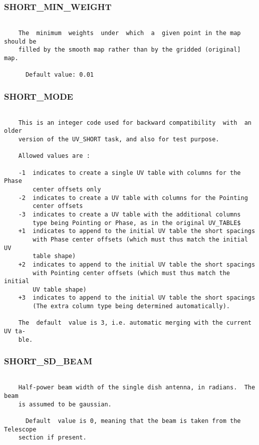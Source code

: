 \subsubsection{SHORT\_MIN\_WEIGHT}
\begin{verbatim}

    The  minimum  weights  under  which  a  given point in the map should be
    filled by the smooth map rather than by the gridded (original] map.

      Default value: 0.01

\end{verbatim}
\subsubsection{SHORT\_MODE}
\begin{verbatim}

    This is an integer code used for backward compatibility  with  an  older
    version of the UV_SHORT task, and also for test purpose.

    Allowed values are :

    -1  indicates to create a single UV table with columns for the Phase
        center offsets only
    -2  indicates to create a UV table with columns for the Pointing
        center offsets
    -3  indicates to create a UV table with the additional columns
        type being Pointing or Phase, as in the original UV_TABLE$
    +1  indicates to append to the initial UV table the short spacings
        with Phase center offsets (which must thus match the initial UV
        table shape)
    +2  indicates to append to the initial UV table the short spacings
        with Pointing center offsets (which must thus match the initial
        UV table shape)
    +3  indicates to append to the initial UV table the short spacings
        (The extra column type being determined automatically).

    The  default  value is 3, i.e. automatic merging with the current UV ta-
    ble.

\end{verbatim}
\subsubsection{SHORT\_SD\_BEAM}
\begin{verbatim}

    Half-power beam width of the single dish antenna, in radians.  The  beam
    is assumed to be gaussian.

      Default  value is 0, meaning that the beam is taken from the Telescope
    section if present.

\end{verbatim}

